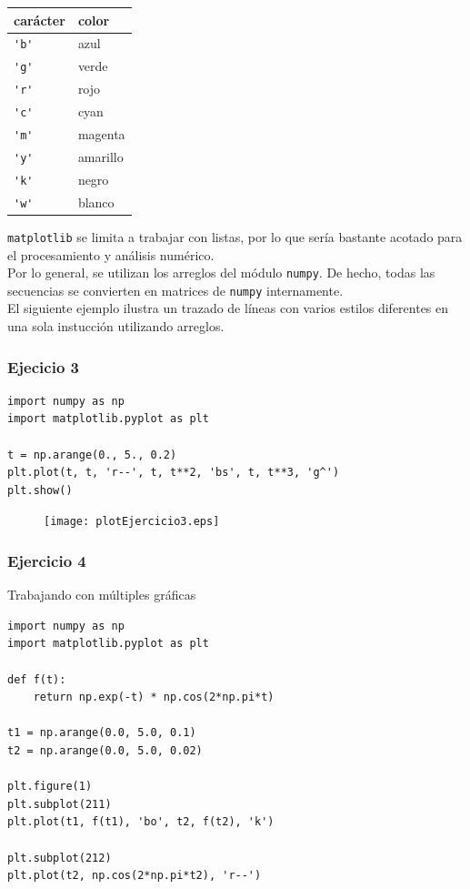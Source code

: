 \begin{frame}[fragile]
\begin{tabular}{l | l}
car\'{a}cter & color \\ \hline
\verb|'b'| & azul \\ \hline
\verb|'g'| & verde \\ \hline
\verb|'r'| & rojo \\ \hline
\verb|'c'| & cyan \\ \hline
\verb|'m'| & magenta \\ \hline
\verb|'y'| & amarillo \\ \hline
\verb|'k'| & negro \\ \hline
\verb|'w'| & blanco
\end{tabular}
\end{frame}
\begin{frame}
\texttt{matplotlib} se limita a trabajar con listas, por lo que ser\'{i}a bastante acotado para el procesamiento y an\'{a}lisis num\'{e}rico.
\\
\medskip
Por lo general, se utilizan los arreglos del m\'{o}dulo \texttt{numpy}. De hecho, todas las secuencias se convierten en matrices de \texttt{numpy} internamente.
\\
\medskip
El siguiente ejemplo ilustra un trazado de l\'{i}neas con varios estilos diferentes en una sola instucci\'{o}n utilizando arreglos.
\end{frame}
\begin{frame}[fragile]
\frametitle{Ejecicio 3}
\begin{lstlisting}
import numpy as np
import matplotlib.pyplot as plt

t = np.arange(0., 5., 0.2)
plt.plot(t, t, 'r--', t, t**2, 'bs', t, t**3, 'g^')
plt.show()
\end{lstlisting}
\end{frame}
\begin{frame}[fragile]
\begin{figure}
	\centering
	\texttt{[image: plotEjercicio3.eps]}
\end{figure}
\end{frame}
\begin{frame}[fragile]
\frametitle{Ejercicio 4}
Trabajando con m\'{u}ltiples gr\'{a}ficas
\begin{lstlisting}
import numpy as np
import matplotlib.pyplot as plt

def f(t):
    return np.exp(-t) * np.cos(2*np.pi*t)

t1 = np.arange(0.0, 5.0, 0.1)
t2 = np.arange(0.0, 5.0, 0.02)

plt.figure(1)
plt.subplot(211)
plt.plot(t1, f(t1), 'bo', t2, f(t2), 'k')

plt.subplot(212)
plt.plot(t2, np.cos(2*np.pi*t2), 'r--')
\end{lstlisting}
\end{frame}
